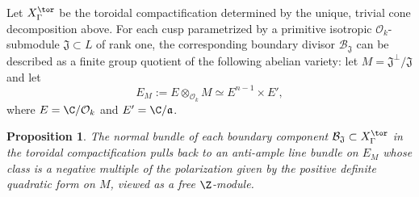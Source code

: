 \documentclass[11pt,letterpaper,english]{amsart}
\numberwithin{equation}{subsection}
\numberwithin{equation}{section}
\newcommand\cB{{\mathcal B}}
\theoremstyle{plain}
\newtheorem{proposition}[theorem]{Proposition}
\theoremstyle{remark}
\begin{document}
Let $X_\Gamma^{\tor}$ be the toroidal compactification determined by the unique, trivial cone decomposition above. For each cusp parametrized by a primitive isotropic $\mathcal{O}_k$-submodule $\mathfrak{J}\subset L$ of rank one, the corresponding boundary divisor $\cB_{\mathfrak J}$ can be described as a finite group quotient of the following abelian variety: let $M = \mathfrak J^\bot/\mathfrak J$ and let
\[E_M := E \otimes_{\mathcal{O}_k} M \simeq E^{n-1}\times E',  \]
where $E=\C/\mathcal{O}_k$ and $E'=\C/\mathfrak{a}$.

\begin{proposition}\label{propo:normal-is-ample}
    The normal bundle of each boundary component $\cB_{\mathfrak J}\subset X_\Gamma^\tor$ in the toroidal compactification pulls back to an anti-ample line bundle on $E_M$ whose class is a negative multiple of the polarization given by the positive definite quadratic form on $M$, viewed as a free $\Z$-module.
\end{proposition}
\end{document}
